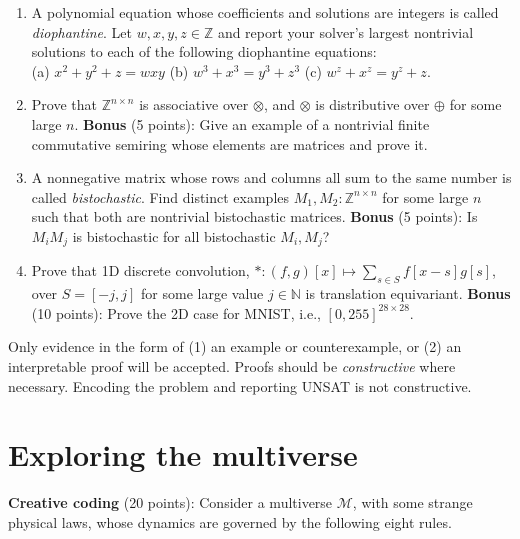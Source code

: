 \documentclass[11pt]{article}
\begin{document}
    \begin{enumerate}
        \item A polynomial equation whose coefficients and solutions are integers is called \textit{diophantine}. Let $w, x, y, z \in \mathbb{Z}$ and report your solver's largest nontrivial solutions to each of the following diophantine equations:\\ (a) $x^2+y^2+z = wxy$ (b) $w^3 + x^3 = y^3+z^3$ (c) $w^z + x^z = y^z + z$.
        \item Prove that $\mathbb{Z}^{n\times n}$ is associative over $\otimes$, and $\otimes$ is distributive over $\oplus$ for some large $n$. \textbf{Bonus} (5 points): Give an example of a nontrivial finite commutative semiring whose elements are matrices and prove it.
        \item A nonnegative matrix whose rows and columns all sum to the same number is called \textit{bistochastic}. Find distinct examples $M_1, M_2: \mathbb{Z}^{n\times n}$ for some large $n$ such that both are nontrivial bistochastic matrices. \textbf{Bonus} (5 points): Is $M_i M_j$ is bistochastic for all bistochastic $M_i, M_j$?
        \item Prove that 1D discrete convolution, $*: (f, g)[x] \mapsto \sum_{s \in S}f[x-s]g[s]$, over $S=[-j, j]$ for some large value $j \in \mathbb{N}$ is translation equivariant. \textbf{Bonus} (10 points): Prove the 2D case for MNIST, i.e., $[0, 255]^{28\times 28}$.
    \end{enumerate}

    \noindent Only evidence in the form of (1) an example or counterexample, or (2) an interpretable proof will be accepted. Proofs should be \textit{constructive} where necessary. Encoding the problem and reporting UNSAT is not constructive.\pagebreak

    \section {Exploring the multiverse}
    \textbf{Creative coding} (20 points): Consider a multiverse $\mathcal{M}$, with some strange physical laws, whose dynamics are governed by the following eight rules.\\
\end{document}
